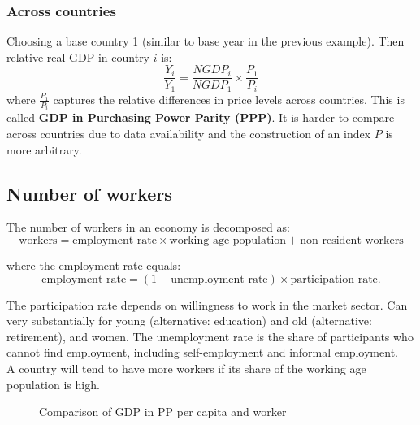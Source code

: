 \documentclass[11pt]{article}
\begin{document}
\subsubsection{Across countries}

Choosing a base country 1 (similar to base year in the previous example). Then relative real GDP in country $i$ is:
\[\dfrac{Y_i}{Y_1} = \dfrac{NGDP_i}{NGDP_1} \times \dfrac{P_1}{P_i}\]
where $\frac{P_1}{P_i}$ captures the relative differences in price levels across countries. This is called \textbf{GDP in Purchasing Power Parity (PPP)}. It is harder to compare across countries due to data availability and the construction of an index $P$ is more arbitrary.

\subsection*{Number of workers}
The number of workers in an economy is decomposed as:
\[\text{workers} = \text{employment rate} \times \text{working age population} + \text{non-resident workers}\]

where the employment rate equals:
\[\text{employment rate} = (1- \text{unemployment rate}) \times \text{participation rate}.\]

The participation rate depends on willingness to work in the market sector. Can very substantially for young (alternative: education) and old (alternative: retirement), and women. The unemployment rate is the share of participants who cannot find employment, including self-employment and informal employment. \\
A country will tend to have more workers if its share of the working age population is high.
\begin{figure}[h]%
    \centering
    \qquad
    \caption{Comparison of GDP in PP per capita and worker}%
    \label{fig:example}%
\end{figure}
\end{document}
